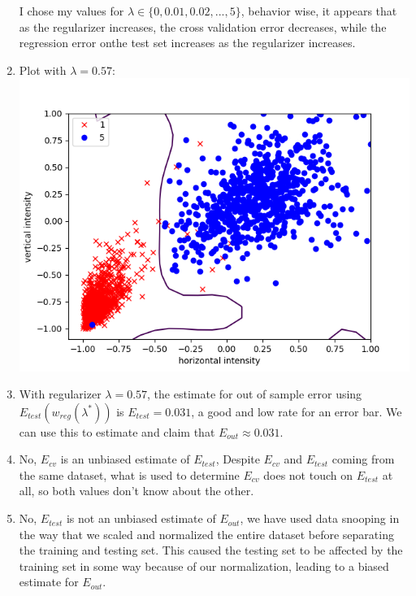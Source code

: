 \documentclass{article}
\begin{document}
\begin{enumerate}
        I chose my values for $\lambda \in \{0, 0.01, 0.02, ..., 5\}$, behavior wise, it appears that as the regularizer increases, the cross validation error decreases, while the regression error onthe test set increases as the regularizer increases.
        \item Plot with $\lambda = 0.57$: \\\includegraphics[scale=0.5]{images/bestReg.png}
        \item With regularizer $\lambda = 0.57$, the estimate for out of sample error using $E_{test}(w_{reg}(\lambda ^*))$ is $E_{test} = 0.031$, a good and low rate for an error bar. We can use this to estimate and claim that $E_{out} \approx 0.031$.
        \item No, $E_{cv}$ is an unbiased estimate of $E_{test}$, Despite $E_{cv}$ and $E_{test}$ coming from the same dataset, what is used to determine $E_{cv}$ does not touch on $E_{test}$ at all, so both values don't know about the other.
        \item No, $E_{test}$ is not an unbiased estimate of $E_{out}$, we have used data snooping in the way that we scaled and normalized the entire dataset before separating the training and testing set. This caused the testing set to be affected by the training set in some way because of our normalization, leading to a biased estimate for $E_{out}$.
    \end{enumerate}
\end{document}
